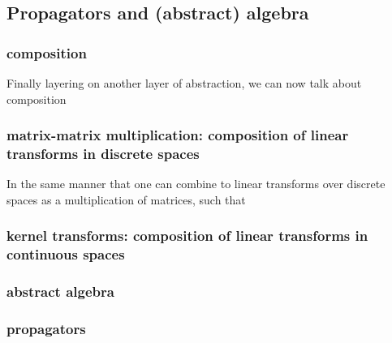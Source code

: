 \documentclass[a4paper,twoside]{article}
\newtheorem{theorem}{Theorem}
\newtheorem{corollary}{Corollary}[theorem]
\newtheorem{definition}{Definition} %
\begin{document}
\subsection{Propagators and (abstract) algebra}
\subsubsection{composition}
Finally layering on another layer of abstraction, we can now talk about composition
\subsubsection{matrix-matrix multiplication: composition of linear transforms in discrete spaces}
In the same manner that one can combine to linear transforms over discrete spaces as a multiplication of matrices, such that 
\subsubsection{kernel transforms: composition of linear transforms in continuous spaces}
\subsubsection{abstract algebra}
\subsubsection{propagators}




% 

% 
% 

 

\printbibliography      %
\end{document}
